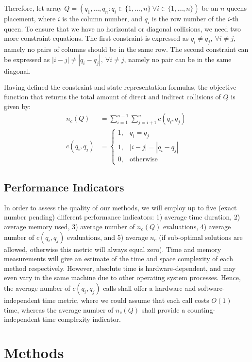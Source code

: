 Therefore, let array $Q=(q_1,...,q_n : q_i \in \{1,...,n\} \ \forall i \in \{1,...,n\})$ be an $n$-queens placement, where $i$ is the column number, and $q_i$ is the row number of the $i$-th queen. To ensure that we have no horizontal or diagonal collisions, we need two more constraint equations. The first constraint is expressed as $q_i\ne q_j, \ \forall i \ne j$, namely no pairs of columns should be in the same row. The second constraint can be expressed as $|i-j| \ne |q_i - q_j|, \ \forall i \ne j$, namely no pair can be in the same diagonal.

Having defined the constraint and state representation formulas, the objective function that returns the total amount of direct and indirect collisions of $Q$ is given by:
\smallskip
\begin{align}
n_c(Q) &= \sum_{i=1}^{n-1} \sum_{j=i+1}^n c(q_i,q_j) \\ 
c(q_i, q_j) &=  
\begin{cases}
   1, & q_i = q_j \\
   1, & |i-j| = |q_i - q_j| \\
    0,              & \text{otherwise}
\end{cases}
\end{align}

\subsection{Performance Indicators}

In order to assess the quality of our methods, we will employ up to five (exact number pending) different performance indicators: 1) average time duration, 2) average memory used, 3) average number of $n_c(Q)$ evaluations, 4) average number of $c(q_i,q_j)$ evaluations, and 5) average $n_c$ (if sub-optimal solutions are allowed, otherwise this metric will always equal zero). Time and memory measurements will give an estimate of the time and space complexity of each method respectively. However, absolute time is hardware-dependent, and may even vary in the same machine due to other operating system processes. Hence, the average number of $c(q_i, q_j)$ calls shall offer a hardware and software-independent time metric, where we could assume that each call costs $O(1)$ time, whereas the average number of $n_c(Q)$ shall provide a counting-independent time complexity indicator.

\section{Methods}
\label{sec:methods}

